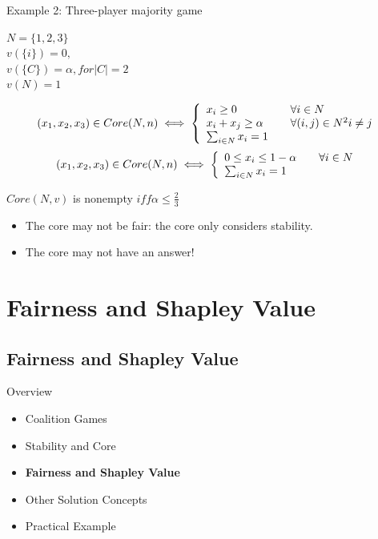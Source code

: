 \documentclass{beamer}
\begin{document}
\begin{frame} {Example 2: Three-player majority game}
    \begin{center}
      $N = \{1,2,3\}$ \\
      $v(\{i\}) = 0,$\\
      $v(\{C\}) = \alpha, for |C| = 2$ \\
      $v(N) = 1$ \\
    \end{center}
    \[ (x_1, x_2, x_3) \in Core(N,n) \iff \left\{
      \begin{array}{l l}
        x_i \geq 0 & \quad \forall i \in N\\
        x_i + x_j \geq \alpha & \quad \forall(i,j) \in N^2 i \neq j\\
        \sum_{i \in N} x_i = 1 &
      \end{array} \right.\]
    \[ (x_1, x_2, x_3) \in Core(N,n) \iff \left\{
      \begin{array}{l l}
        0 \leq x_i \leq 1 - \alpha & \quad \forall i \in N\\
        \sum_{i \in N} x_i = 1 &
      \end{array} \right.\]

    $Core(N,v)$ is nonempty $iff \alpha \leq \frac{2}{3}$ \\

    \begin{itemize}
        \item The core may not be fair: the core only considers stability. \\
        \item The core may not have an answer!
    \end{itemize}

\end{frame}
\section{Fairness and Shapley Value}
\subsection{Fairness and Shapley Value}

\begin{frame}{Overview}
    \begin{itemize}
     	\itemsep=.5cm
    	\item Coalition Games
    	\item Stability and Core
    	\item {\bf Fairness and Shapley Value}
    	\item Other Solution Concepts
        \item Practical Example
    \end{itemize}
\end{frame}
\end{document}
